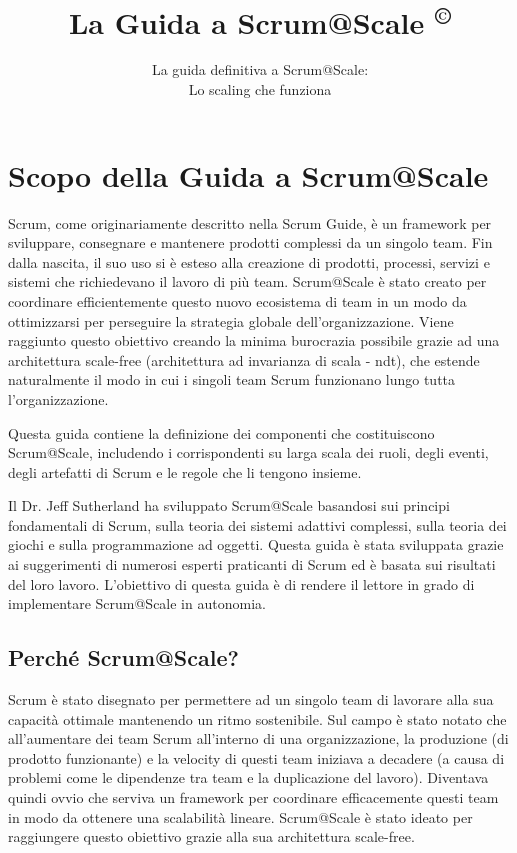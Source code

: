 \documentclass[12pt,a4paper,parskip=full]{scrartcl}
\title{\Huge{\color{red}\textbf{La Guida a Scrum@Scale
\textsuperscript{\copyright}
}}}
\subtitle{\color{gray}La guida definitiva a Scrum@Scale:\\ Lo scaling che funziona}
\date{}
\begin{document}

\section{Scopo della Guida a Scrum@Scale}
Scrum, come originariamente descritto nella Scrum Guide, è un 
framework per sviluppare, consegnare e mantenere prodotti complessi da 
un singolo team. Fin dalla nascita, il suo uso si è esteso alla creazione di 
prodotti, processi, servizi e sistemi che richiedevano il lavoro di più team.
Scrum@Scale è stato creato per coordinare efficientemente questo nuovo 
ecosistema di team in un modo da ottimizzarsi per perseguire la strategia 
globale dell'organizzazione. Viene raggiunto questo obiettivo creando la 
minima burocrazia possibile grazie ad una architettura scale-free (architettura ad invarianza di scala - ndt), che estende naturalmente il modo in cui i singoli team Scrum funzionano lungo tutta l'organizzazione.

Questa guida contiene la definizione dei componenti che costituiscono Scrum@Scale, includendo i corrispondenti su larga scala dei ruoli, degli eventi, degli artefatti di Scrum e le regole che li tengono insieme.

Il Dr. Jeff Sutherland ha sviluppato Scrum@Scale basandosi sui principi fondamentali di Scrum, sulla teoria dei sistemi adattivi complessi, sulla teoria dei giochi e sulla programmazione ad oggetti. Questa guida è stata sviluppata grazie ai suggerimenti di numerosi esperti praticanti di Scrum ed è basata sui risultati del loro lavoro. L'obiettivo di questa guida è di rendere il lettore in grado di implementare Scrum@Scale in autonomia.

\subsection{Perché Scrum@Scale?}
Scrum è stato disegnato per permettere ad un singolo team di lavorare 
alla sua capacità ottimale mantenendo un ritmo sostenibile. Sul campo è
stato notato che all'aumentare dei team Scrum all'interno di una organizzazione,
la produzione (di prodotto funzionante) e la velocity di questi team iniziava a
decadere (a causa di problemi come le dipendenze tra team e la duplicazione
del lavoro). Diventava quindi ovvio che serviva un framework per coordinare 
efficacemente questi team in modo da ottenere una scalabilità lineare.
Scrum@Scale è stato ideato per raggiungere questo obiettivo grazie alla
sua architettura scale-free.
\end{document}
